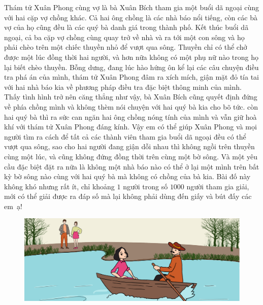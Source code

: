 \begin{multicols}{2}
	Thám tử Xuân Phong cùng vợ là bà Xuân Bích tham gia một buổi dã ngoại cùng với hai cặp vợ chồng khác. Cả hai ông chồng là các nhà báo nổi tiếng, còn các bà vợ của họ cũng đều là các quý bà danh giá trong thành phố. Kết thúc buổi dã ngoại, cả ba cặp vợ chồng cùng quay trở về nhà và ra tới một con sông và họ phải chèo trên một chiếc thuyền nhỏ để vượt qua sông. Thuyền chỉ có thể chở được một lúc đồng thời hai người, và hơn nữa không có một phụ nữ nào trong họ lại biết chèo thuyền.
	\vskip 0.1cm
	Bỗng dưng, đang lúc hào hứng ôn kể lại các câu chuyện điều tra phá án của mình, thám tử Xuân Phong đâm ra xích mích, giận mặt đỏ tía tai với hai nhà báo kia về phương pháp điều tra đặc biệt thông minh của mình. Thấy tình hình trở nên căng thẳng như vậy, bà Xuân Bích cũng quyết định đứng về phía chồng mình và không thèm nói chuyện với hai quý bà kia cho bõ tức. còn hai quý bà thì ra sức can ngăn hai ông chồng nóng tính của mình và vẫn giữ hoà khí với thám tử Xuân Phong đáng kính.
	\vskip 0.1cm
	Vậy em có thể giúp Xuân Phong và mọi người tìm ra cách để tất cả các thành viên tham gia buổi dã ngoại đều có thể vượt qua sông, sao cho hai người đang giận dỗi nhau thì không ngồi trên thuyền cùng một lúc, và cũng không đứng đồng thời trên cùng một bờ sông. Và một yêu cầu đặc biệt đặt ra nữa là không một nhà báo nào có thể ở lại một mình trên bất kỳ bờ sông nào cùng với hai quý bà mà không có chồng của bà kia. 
	\vskip 0.1cm
	Bài đố này không khó nhưng rất ít, chỉ khoảng $1$ người trong số $1000$ người tham gia giải, mới có thể giải được ra đáp số mà lại không phải dùng đến giấy và bút đấy các em~ạ!
\end{multicols}
	\begin{figure}[H]
	\centering
	\vspace*{-8pt}
	\captionsetup{labelformat= empty, justification=centering}
	\includegraphics[width=1\linewidth]{xuanphong}
	\vspace*{-10pt}
\end{figure}
\newpage
\begingroup
